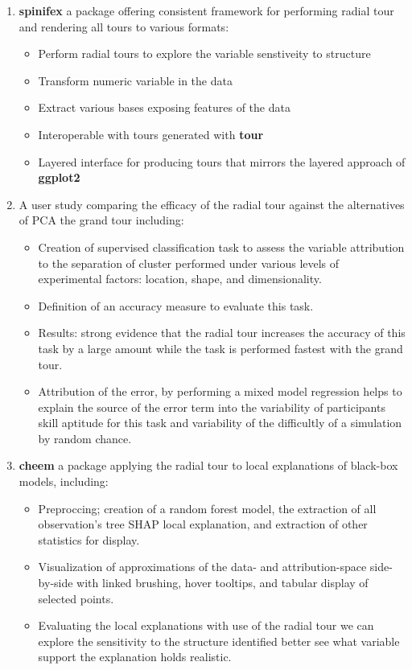 \documentclass{template/monashthesis}
\begin{document}
\begin{enumerate}
\def\labelenumi{\arabic{enumi}.}
\tightlist
\item
  \textbf{spinifex} a package offering consistent framework for performing radial tour and rendering all tours to various formats:

  \begin{itemize}
  \tightlist
  \item
    Perform radial tours to explore the variable senstiveity to structure
  \item
    Transform numeric variable in the data
  \item
    Extract various bases exposing features of the data
  \item
    Interoperable with tours generated with \textbf{tour} \autocite{wickham_tourr:_2011}
  \item
    Layered interface for producing tours that mirrors the layered approach of \textbf{ggplot2} \autocite{wickham_ggplot2_2016}
  \end{itemize}
\item
  A user study comparing the efficacy of the radial tour against the alternatives of PCA the grand tour including:

  \begin{itemize}
  \tightlist
  \item
    Creation of supervised classification task to assess the variable attribution to the separation of cluster performed under various levels of experimental factors: location, shape, and dimensionality.
  \item
    Definition of an accuracy measure to evaluate this task.
  \item
    Results: strong evidence that the radial tour increases the accuracy of this task by a large amount while the task is performed fastest with the grand tour.
  \item
    Attribution of the error, by performing a mixed model regression helps to explain the source of the error term into the variability of participants skill aptitude for this task and variability of the difficultly of a simulation by random chance.
  \end{itemize}
\item
  \textbf{cheem} a package applying the radial tour to local explanations of black-box models, including:

  \begin{itemize}
  \tightlist
  \item
    Preproccing; creation of a random forest model, the extraction of all observation's tree SHAP local explanation, and extraction of other statistics for display.
  \item
    Visualization of approximations of the data- and attribution-space side-by-side with linked brushing, hover tooltips, and tabular display of selected points.
  \item
    Evaluating the local explanations with use of the radial tour we can explore the sensitivity to the structure identified better see what variable support the explanation holds realistic.
  \end{itemize}
\end{enumerate}
\end{document}
